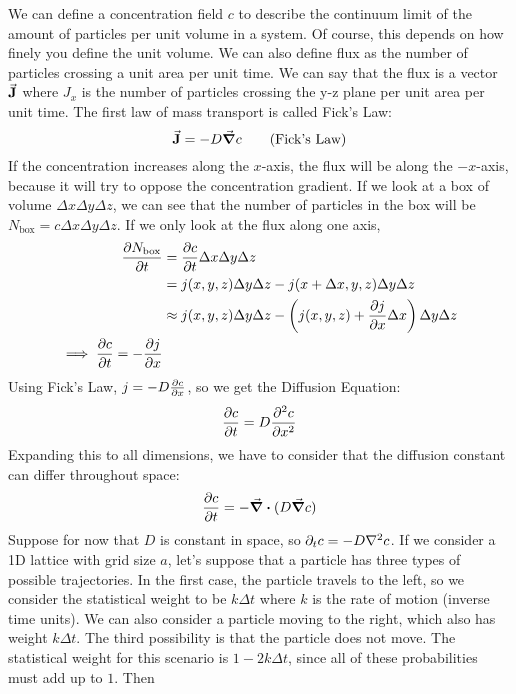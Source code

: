 \documentclass[a4paper,twoside,master.tex]{subfiles}
\begin{document}
We can define a concentration field $ c $ to describe the continuum limit of the amount of particles per unit volume in a system. Of course, this depends on how finely you define the unit volume. We can also define flux as the number of particles crossing a unit area per unit time. We can say that the flux is a vector $ \va{J} $ where $ J_x $ is the number of particles crossing the y-z plane per unit area per unit time. The first law of mass transport is called Fick's Law:
\begin{equation}
    \va{J} = - D \grad{c}\tag{Fick's Law} 
\end{equation}
If the concentration increases along the $ x $-axis, the flux will be along the $ -x $-axis, because it will try to oppose the concentration gradient. If we look at a box of volume $ \Delta x \Delta y \Delta z $, we can see that the number of particles in the box will be $ N_{\text{box}} = c \Delta x \Delta y \Delta z $. If we only look at the flux along one axis,
\begin{align}
    \pdv{N_{\text{box}}}{t} &= \pdv{c}{t} \Delta x \Delta y \Delta z \\
                            &= j(x,y,z) \Delta y \Delta z - j (x + \Delta x, y,z) \Delta y \Delta z \\
                            &\approx j(x,y,z) \Delta y \Delta z - \left( j(x,y,z) + \pdv{j}{x} \Delta x \right) \Delta y \Delta z \\
                            \implies \pdv{c}{t} = - \pdv{j}{x}
\end{align}
Using Fick's Law, $ j = - D \pdv{c}{x} $, so we get the Diffusion Equation:
\begin{equation}
    \pdv{c}{t} = D \pdv[2]{c}{x}
\end{equation}
Expanding this to all dimensions, we have to consider that the diffusion constant can differ throughout space:
\begin{equation}
    \pdv{c}{t} = - \div{(D \grad{c})}
\end{equation}
Suppose for now that $ D $ is constant in space, so $ \partial_t c = -D \laplacian{c} $. If we consider a 1D lattice with grid size $ a $, let's suppose that a particle has three types of possible trajectories. In the first case, the particle travels to the left, so we consider the statistical weight to be $ k \Delta t $ where $ k $ is the rate of motion (inverse time units). We can also consider a particle moving to the right, which also has weight $ k \Delta t $. The third possibility is that the particle does not move. The statistical weight for this scenario is $ 1 - 2 k \Delta t $, since all of these probabilities must add up to $ 1 $. Then
\end{document}
